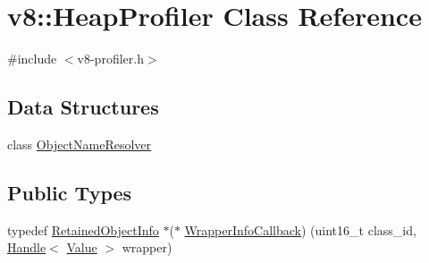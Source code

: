 \hypertarget{classv8_1_1HeapProfiler}{}\section{v8\+:\+:Heap\+Profiler Class Reference}
\label{classv8_1_1HeapProfiler}


{\ttfamily \#include $<$v8-\/profiler.\+h$>$}

\subsection*{Data Structures}
\begin{DoxyCompactItemize}
\item 
class \hyperlink{classv8_1_1HeapProfiler_1_1ObjectNameResolver}{Object\+Name\+Resolver}
\end{DoxyCompactItemize}
\subsection*{Public Types}
\begin{DoxyCompactItemize}
\item 
typedef \hyperlink{classv8_1_1RetainedObjectInfo}{Retained\+Object\+Info} $\ast$($\ast$ \hyperlink{classv8_1_1HeapProfiler_a696d8d6590879eeb5a4ad2814eafb599}{Wrapper\+Info\+Callback}) (uint16\+\_\+t class\+\_\+id, \hyperlink{classv8_1_1Handle}{Handle}$<$ \hyperlink{classv8_1_1Value}{Value} $>$ wrapper)
\end{DoxyCompactItemize}
